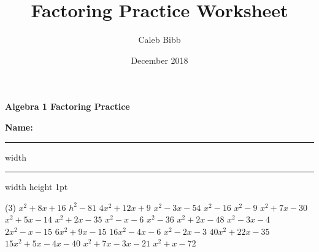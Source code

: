 \documentclass{article}
\title{Factoring Practice Worksheet}
\author{Caleb Bibb}
\date{December 2018}
\newcommand{\V}{\vspace{1in}}
\begin{document}
{\large\bfseries Algebra 1 \hfill  Factoring Practice}

\bigskip

{\bfseries Name: \underline{\hspace{3in}}}
\bigskip
\hrule width \hsize \kern 0.5mm \hrule width \hsize height 1pt
\begin{tasks}[style=enumerate](3)
\task $x^2 +8x +16$
\task $h^2 -81$
\task $4x^2 +12x +9$
\V
\task $x^2 -3x -54$
\task $x^2 -16$
\task $x^2 -9$
\V
\task $x^2 +7x -30$
\task $x^2 +5x -14$
\task $x^2 +2x -35$
\V
\task $x^2 -x -6$
\task $x^2 -36$
\task $x^2 +2x -48$
\V
\task $x^2 -3x -4$
\task $2x^2 -x -15$
\task $6x^2 +9x -15$
\V
\task $16x^2 -4x -6$
\task $x^2 -2x -3$
\task $40x^2 +22x - 35$
\V
\task $15x^2 +5x -4x -40$
\task $x^2 +7x -3x -21$
\task $x^2 +x -72$
\end{tasks}

\end{document}

